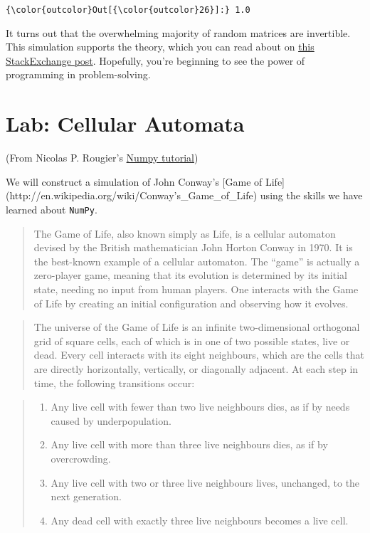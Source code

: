 \documentclass{article}
\begin{document}
            \begin{Verbatim}[commandchars=\\\{\}]
{\color{outcolor}Out[{\color{outcolor}26}]:} 1.0
\end{Verbatim}
        
    It turns out that the overwhelming majority of random matrices are
invertible. This simulation supports the theory, which you can read
about on
\href{http://math.stackexchange.com/questions/606295/are-most-matrices-invertible}{this
StackExchange post}. Hopefully, you're beginning to see the power of
programming in problem-solving.

    \section{Lab: Cellular Automata}\label{lab-cellular-automata}

(From Nicolas P. Rougier's
\href{http://www.labri.fr/perso/nrougier/teaching/numpy/numpy.html\#the-way-of-numpy}{Numpy
tutorial})

We will construct a simulation of John Conway's {[}Game of
Life{]}(http://en.wikipedia.org/wiki/Conway's\_Game\_of\_Life) using the
skills we have learned about \texttt{NumPy}.

\begin{quote}
The Game of Life, also known simply as Life, is a cellular automaton
devised by the British mathematician John Horton Conway in 1970. It is
the best-known example of a cellular automaton. The ``game'' is actually
a zero-player game, meaning that its evolution is determined by its
initial state, needing no input from human players. One interacts with
the Game of Life by creating an initial configuration and observing how
it evolves.
\end{quote}

\begin{quote}
The universe of the Game of Life is an infinite two-dimensional
orthogonal grid of square cells, each of which is in one of two possible
states, live or dead. Every cell interacts with its eight neighbours,
which are the cells that are directly horizontally, vertically, or
diagonally adjacent. At each step in time, the following transitions
occur:
\end{quote}

\begin{quote}
\begin{enumerate}
\def\labelenumi{\arabic{enumi}.}
\itemsep1pt\parskip0pt
\item
  Any live cell with fewer than two live neighbours dies, as if by needs
  caused by underpopulation.
\item
  Any live cell with more than three live neighbours dies, as if by
  overcrowding.
\item
  Any live cell with two or three live neighbours lives, unchanged, to
  the next generation.
\item
  Any dead cell with exactly three live neighbours becomes a live cell.
\end{enumerate}
\end{quote}
\end{document}
